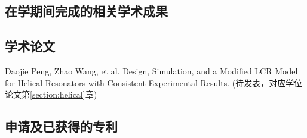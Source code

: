 \begin{resume}



  \section{在学期间完成的相关学术成果}


  \subsection{学术论文}

  \begin{achievements}
    \item Daojie Peng, Zhao Wang, et al. Design, Simulation, and a Modified LCR Model for Helical Resonators with Consistent Experimental Results. (待发表，对应学位论文第\ref{section:helical}章)
  \end{achievements}

  \subsection{申请及已获得的专利}


\end{resume}
